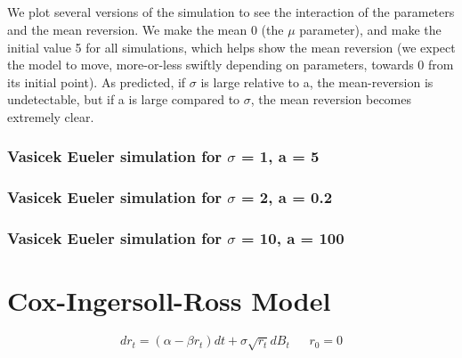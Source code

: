 \documentclass[a4paper,12pt]{article}
\begin{document}
\subsection{}
We plot several versions of the simulation to see the interaction of the parameters and the mean reversion. We make the mean 0 (the $\mu$ parameter), and make the initial value 5 for all simulations, which helps show the mean reversion (we expect the model to move, more-or-less swiftly depending on parameters, towards 0 from its initial point). As predicted, if $\sigma$ is large relative to a, the mean-reversion is undetectable, but if a is large compared to $\sigma$, the mean reversion becomes extremely clear.

\subsubsection{Vasicek Eueler simulation for $\sigma$ = 1, a = 5}

\subsubsection{Vasicek Eueler simulation for $\sigma$ = 2, a = 0.2}

\subsubsection{Vasicek Eueler simulation for $\sigma$ = 10, a = 100}

\section{Cox-Ingersoll-Ross Model}
$$
dr_t = (\alpha - \beta r_t)dt + \sigma \sqrt{r_t}dB_t \ \ \ \ \ \ \ r_0 = 0
$$
\end{document}
